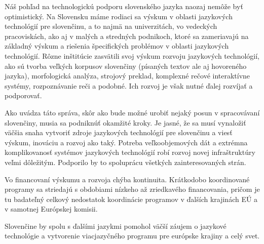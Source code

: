 \begin{multicols}{2}
Náš pohľad na technologickú podporu slovenského jazyka naozaj nemôže byť
optimistický. Na Slovensku máme rodiaci sa výskum v oblasti jazykových
technológií pre slovenčinu, a to najmä na univerzitách, vo vedeckých
pracoviskách, ako aj v malých a stredných podnikoch, ktoré sa zameriavajú na
základný výskum a riešenia špecifických problémov v oblasti jazykových
technológií. Rôzne inštitúcie zasvätili svoj výskum rozvoju jazykových
technológií, ako sú tvorba veľkých korpusov slovenčiny (písaných textov ale aj
hovoreného jazyka), morfologická analýza, strojový preklad, komplexné
rečové interaktívne systémy, rozpoznávanie reči a podobné.  Ich rozvoj je však
nutné ďalej rozvíjať a podporovať.

Ako uvádza táto správa, skôr ako bude možné urobiť nejaký posun v spracovávaní
slovenčiny, musia sa podniknúť okamžité kroky. Je jasné, že sa musí vynaložiť
väčšia snaha vytvoriť zdroje jazykových technológií pre slovenčinu a viesť
výskum, inováciu a rozvoj ako taký. Potreba veľkoobjemových dát a extrémna
komplikovanosť systémov jazykových technológií robí rozvoj novej infraštruktúry
veľmi dôležitým. Podporilo by to spoluprácu všetkých zainteresovaných strán.

Vo financovaní výskumu a rozvoja chýba kontinuita. Krátkodobo koordinované
programy sa striedajú s obdobiami nízkeho až zriedkavého financovania, pričom
je tu badateľný celkový nedostatok koordinácie programov v ďalších krajinách EÚ
a v samotnej Európskej komisii.

Slovenčine by spolu s ďalšími jazykmi pomohol väčší záujem o jazykové technológie a vytvorenie viacjazyčného programu pre európske krajiny a celý svet\cite{f32}.

\end{multicols}

\clearpage

